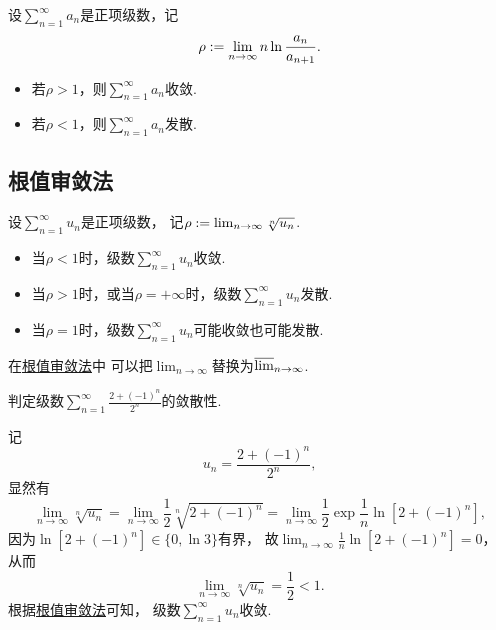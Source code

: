 \begin{proposition}
设\(\sum_{n=1}^\infty a_n\)是正项级数，记\[
	\rho := \lim_{n\to\infty} n \ln\frac{a_n}{a_{n+1}}.
\]
\begin{itemize}
	\item 若\(\rho>1\)，则\(\sum_{n=1}^\infty a_n\)收敛.
	\item 若\(\rho<1\)，则\(\sum_{n=1}^\infty a_n\)发散.
\end{itemize}
\end{proposition}

\subsection{根值审敛法}
\begin{theorem}\label{theorem:无穷级数.正项级数的根值审敛法}
设\(\sum_{n=1}^\infty u_n\)是正项级数，
记\(\rho := \lim_{n\to\infty} \sqrt[n]{u_n}\).
\begin{itemize}
	\item 当\(\rho<1\)时，级数\(\sum_{n=1}^\infty u_n\)收敛.
	\item 当\(\rho>1\)时，或当\(\rho=+\infty\)时，级数\(\sum_{n=1}^\infty u_n\)发散.
	\item 当\(\rho=1\)时，级数\(\sum_{n=1}^\infty u_n\)可能收敛也可能发散.
\end{itemize}
\end{theorem}
在\hyperref[theorem:无穷级数.正项级数的根值审敛法]{根值审敛法}中
可以把\(\lim_{n\to\infty}\)替换为\(\varlimsup_{n\to\infty}\).

\begin{example}
判定级数\(\sum_{n=1}^\infty \frac{2+(-1)^n}{2^n}\)的敛散性.
\begin{solution}
记\[
	u_n = \frac{2+(-1)^n}{2^n},
\]
显然有\[
	\lim_{n\to\infty} \sqrt[n]{u_n}
	= \lim_{n\to\infty} \frac{1}{2} \sqrt[n]{2+(-1)^n}
	= \lim_{n\to\infty} \frac{1}{2} \exp{\frac{1}{n} \ln[2+(-1)^n]},
\]
因为\(\ln[2+(-1)^n] \in \{ 0, \ln3 \}\)有界，
故\(\lim_{n\to\infty} \frac{1}{n} \ln[2+(-1)^n] = 0\)，
从而\[
	\lim_{n\to\infty} \sqrt[n]{u_n} = \frac{1}{2} < 1.
\]
根据\hyperref[theorem:无穷级数.正项级数的根值审敛法]{根值审敛法}可知，
级数\(\sum_{n=1}^\infty u_n\)收敛.
\end{solution}
\end{example}

